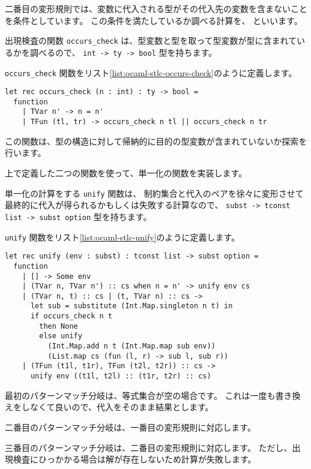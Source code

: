 二番目の変形規則では、変数に代入される型がその代入先の変数を含まないことを条件としています。
この条件を満たしているか調べる計算を、 といいます。

出現検査の関数 \texttt{occurs\_check} は、型変数と型を取って型変数が型に含まれているかを調べるので、
\texttt{int -> ty -> bool} 型を持ちます。

\texttt{occurs\_check} 関数をリスト\ref{list:ocaml-stlc-occurs-check}のように定義します。

\begin{lstlisting}[caption=出現検査, label=list:ocaml-stlc-occurs-check]
let rec occurs_check (n : int) : ty -> bool =
  function
    | TVar n' -> n = n'
    | TFun (tl, tr) -> occurs_check n tl || occurs_check n tr
\end{lstlisting}

この関数は、型の構造に対して帰納的に目的の型変数が含まれていないか探索を行います。

上で定義した二つの関数を使って、単一化の関数を実装します。

単一化の計算をする \texttt{unify} 関数は、
制約集合と代入のペアを徐々に変形させて最終的に代入が得られるかもしくは失敗する計算なので、
\texttt{subst -> tconst list -> subst option} 型を持ちます。

\texttt{unify} 関数をリスト\ref{list:ocaml-stlc-unify}のように定義します。

\begin{lstlisting}[caption=単一化, label=list:ocaml-stlc-unify]
let rec unify (env : subst) : tconst list -> subst option =
  function
    | [] -> Some env
    | (TVar n, TVar n') :: cs when n = n' -> unify env cs
    | (TVar n, t) :: cs | (t, TVar n) :: cs ->
      let sub = substitute (Int.Map.singleton n t) in
      if occurs_check n t
        then None
        else unify
          (Int.Map.add n t (Int.Map.map sub env))
          (List.map cs (fun (l, r) -> sub l, sub r))
    | (TFun (t1l, t1r), TFun (t2l, t2r)) :: cs ->
      unify env ((t1l, t2l) :: (t1r, t2r) :: cs)
\end{lstlisting}

最初のパターンマッチ分岐は、等式集合が空の場合です。
これは一度も書き換えをしなくて良いので、代入をそのまま結果とします。

二番目のパターンマッチ分岐は、一番目の変形規則に対応します。

三番目のパターンマッチ分岐は、二番目の変形規則に対応します。
ただし、出現検査にひっかかる場合は解が存在しないため計算が失敗します。

